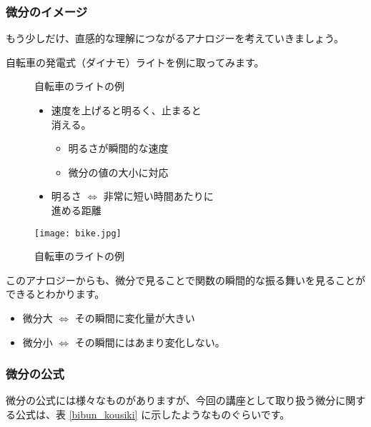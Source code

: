 \documentclass[uplatex,dvipdfmx,a4paper,11pt]{jsarticle}
\begin{document}
\subsubsection{微分のイメージ}
もう少しだけ、直感的な理解につながるアナロジーを考えていきましょう。

自転車の発電式（ダイナモ）ライトを例に取ってみます。

\begin{figure}[htb]
	\begin{center}
		\begin{minipage}{0.5\textwidth}
			\large
			\begin{itembox}[l]{自転車のライトの例}
				\begin{itemize}
					\item 速度を上げると明るく、止まると\\消える。
					\begin{itemize}
						\item 明るさが瞬間的な速度
						\item 微分の値の大小に対応
					\end{itemize}
					\item 明るさ $\Leftrightarrow$ 非常に短い時間あたりに\\進める距離
				\end{itemize}
			\end{itembox}
		\end{minipage}
		\begin{minipage}{0.4\textwidth}
			\begin{center}
			\texttt{[image: bike.jpg]}
			\end{center}
		\end{minipage}
		\caption{自転車のライトの例}
		\label{bike_light}
	\end{center}
\end{figure}

このアナロジーからも、微分で見ることで関数の瞬間的な振る舞いを見ることができるとわかります。
\begin{itemize}
	\item 微分大 $\Leftrightarrow$ その瞬間に変化量が大きい
	\item 微分小 $\Leftrightarrow$ その瞬間にはあまり変化しない。
\end{itemize}

\subsubsection{微分の公式}
微分の公式には様々なものがありますが、今回の講座として取り扱う微分に関する公式は、表 \ref{bibun_kousiki} に示したようなものぐらいです。
\end{document}
